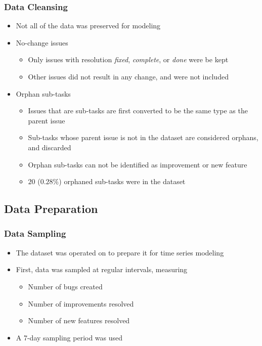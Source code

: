 \documentclass[presentation]{beamer}
\begin{document}
\begin{frame}[t]
\frametitle{Data Cleansing}
\begin{itemize}
\item{Not all of the data was preserved for modeling}
\item{No-change issues
  \begin{itemize}
  \item{Only issues with resolution \textit{fixed}, \textit{complete}, or \textit{done} were be kept}
  \item{Other issues did not result in any change, and were not included}  
  \end{itemize}
}
\item{Orphan sub-tasks
  \begin{itemize}
  \item{Issues that are sub-tasks are first converted to be the same type as the parent issue}
  \item{Sub-tasks whose parent issue is not in the dataset are considered orphans, and discarded}
  \item{Orphan sub-tasks can not be identified as improvement or new feature}
  \item{$20$ ($0.28\%$) orphaned sub-tasks were in the dataset}
  \end{itemize}
}
\end{itemize}
\end{frame}

\subsection{Data Preparation}

\begin{frame}[t]
\frametitle{Data Sampling}
\begin{itemize}
\item{The dataset was operated on to prepare it for time series modeling}
\item{First, data was sampled at regular intervals, measuring
  \begin{itemize}
  \item{Number of bugs created}
  \item{Number of improvements resolved}
  \item{Number of new features resolved}
  \end{itemize}
}
\item{A 7-day sampling period was used}
\end{itemize}
\end{frame}
\end{document}
